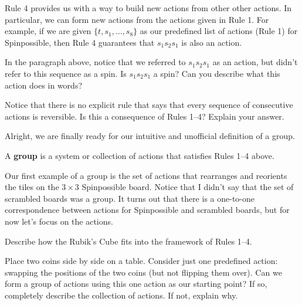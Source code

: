 Rule 4 provides us with a way to build new actions from other other actions.  In particular, we can form new actions from the actions given in Rule 1.  For example, if we are given $\{t,s_1,\ldots, s_8\}$ as our predefined list of actions (Rule 1) for Spinpossible, then Rule 4 guarantees that $s_1 s_2 s_1$ is also an action. 

\begin{exercise}
In the paragraph above, notice that we referred to $s_1 s_2 s_1$ as an action, but didn't refer to this sequence as a spin. Is $s_1 s_2 s_1$ a spin?  Can you describe what this action does in words?
\end{exercise}

\begin{exercise}
Notice that there is no explicit rule that says that every sequence of consecutive actions is reversible.  Is this a consequence of Rules 1--4?  Explain your answer.
\end{exercise}

Alright, we are finally ready for our intuitive and unofficial definition of a group.

\begin{intuitivedef}\label{def:informal_group}
A \textbf{group} is a system or collection of actions that satisfies Rules 1--4 above.
\end{intuitivedef}

Our first example of a group is the set of actions that rearranges and reorients the tiles on the $3\times 3$ Spinpossible board.  Notice that I didn't say that the set of scrambled boards was a group.  It turns out that there is a one-to-one correspondence between actions for Spinpossible and scrambled boards, but for now let's focus on the actions.

\begin{exercise}
Describe how the Rubik's Cube fits into the framework of Rules 1--4.
\end{exercise}

\begin{exercise}\label{exer:2coins}%
Place two coins side by side on a table.  Consider just one predefined action: swapping the positions of the two coins (but not flipping them over).  Can we form a group of actions using this one action as our starting point?  If so, completely describe the collection of actions.  If not, explain why.
\end{exercise}


